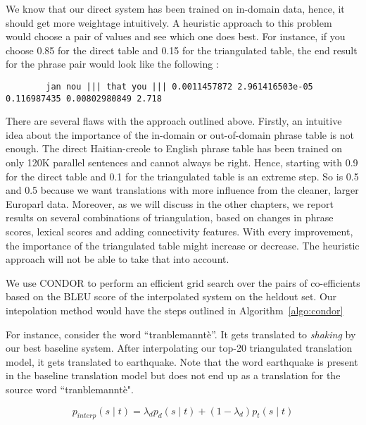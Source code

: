 		We know that our direct system has been trained on in-domain data, hence, it should get more weightage intuitively. A heuristic approach to this problem would choose a pair of values and see which one does best. For instance, if you choose 0.85 for the direct table and 0.15 for the triangulated table, the end result for the phrase pair would look like the following : 

	\begin{verbatim}
		jan nou ||| that you ||| 0.0011457872 2.961416503e-05 0.116987435 0.00802980849 2.718	
	\end{verbatim}

		There are several flaws with the approach outlined above. Firstly, an intuitive idea about the importance of the in-domain or out-of-domain phrase table is not enough. The direct Haitian-creole to English phrase table has been trained on only 120K parallel sentences and cannot always be right. Hence, starting with 0.9 for the direct table and 0.1 for the triangulated table is an extreme step. So is 0.5 and 0.5 because we want translations with more influence from the cleaner, larger Europarl data. Moreover, as we will discuss in the other chapters, we report results on several combinations of triangulation, based on changes in phrase scores, lexical scores and adding connectivity features. With every improvement, the importance of the triangulated table might increase or decrease. The heuristic approach will not be able to take that into account. 

		We use CONDOR to perform an efficient grid search over the pairs of co-efficients based on the BLEU score of the interpolated system on the heldout set. Our intepolation method would have the steps outlined in Algorithm~\ref{algo:condor}
 
		
        For instance, consider the word ``tranblemannt\`e''. It gets translated to \emph{shaking} by our best baseline system. After interpolating our top-20 triangulated translation model, it gets translated to earthquake. Note that the word earthquake is present in the baseline translation model but does not end up as a translation for the source word ``tranblemannt\`e".


        \begin{equation} \label{eq:interpolation}
                p_{interp}(s \mid t) = \lambda_{d} p_{d}(s \mid t) + (1 - \lambda_{d}) p_{t}(s \mid t)
        \end{equation}

